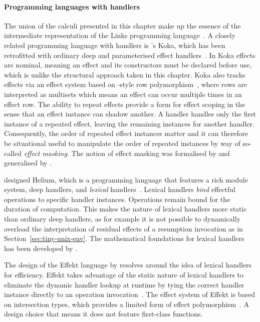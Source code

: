 \documentclass[12pt,phd,lfcs,twoside,openright,logo,leftchapter,normalheadings]{infthesis}
\theoremstyle{plain}
\theoremstyle{definition}
\begin{document}
\paragraph{Programming languages with handlers} The union of the
calculi presented in this chapter make up the essence of the
intermediate representation of the Links programming
language~\cite{HillerstromL16,HillerstromL18}. A closely related
programming language with handlers is \citeauthor{Leijen17}'s Koka,
which has been retrofitted with ordinary deep and parameterised effect
handlers~\cite{Leijen17}. In Koka effects are nominal, meaning an
effect and its constructors must be declared before use, which is
unlike the structural approach taken in this chapter. Koka also tracks
effects via an effect system based on \citeauthor{Leijen05}-style row
polymorphism~\cite{Leijen05,Leijen14}, where rows are interpreted as
multisets which means an effect can occur multiple times in an effect
row. The ability to repeat effects provide a form for effect scoping
in the sense that an effect instance can shadow another. A handler
handles only the first instance of a repeated effect, leaving the
remaining instances for another handler. Consequently, the order of
repeated effect instances matter and it can therefore be situational
useful to manipulate the order of repeated instances by way of
so-called \emph{effect masking}.
%
The notion of effect masking was formalised by \citet{BiernackiPPS18}
and generalised by \citet{ConventLMM20}.
%

\citet{BiernackiPPS18} designed Helium, which is a programming
language that features a rich module system, deep handlers, and
\emph{lexical} handlers~\cite{BiernackiPPS20}. Lexical handlers
\emph{bind} effectful operations to specific handler
instances. Operations remain bound for the duration of
computation. This makes the nature of lexical handlers more static
than ordinary deep handlers, as for example it is not possible to
dynamically overload the interpretation of residual effects of a
resumption invocation as in Section~\ref{sec:tiny-unix-env}.
%
The mathematical foundations for lexical handlers has been developed
by \citet{Geron19}.

The design of the Effekt language by \citet{BrachthauserSO20b}
resolves around the idea of lexical handlers for efficiency. Effekt
takes advantage of the static nature of lexical handlers to eliminate
the dynamic handler lookup at runtime by tying the correct handler
instance directly to an operation
invocation~\cite{BrachthauserS17,SchusterBO20}. The effect system of
Effekt is based on intersection types, which provides a limited form
of effect polymorphism~\cite{BrachthauserSO20b}. A design choice that
means it does not feature first-class functions.
\end{document}
